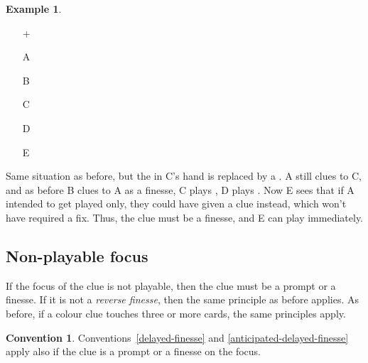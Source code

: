 \documentclass[a4paper]{article}
\theoremstyle{plain}
\theoremstyle{definition}
\newtheorem{example}[theorem]{Example}
\newtheorem{convention}[theorem]{Convention}
\begin{document}
\begin{example}	\hfill \\
	\begin{minipage}{0.45\textwidth}
		\begin{itemize}
			\item[\Large +]      
			\item[\Large A]    
			\item[\Large B]    
			\item[\Large C]    
			\item[\Large D]    
			\item[\Large E]    
		\end{itemize}
	\end{minipage}%
	\begin{minipage}{0.55\textwidth}
		Same situation as before, but the  in C's hand is replaced by a . A still clues  to C, and as before B clues  to A as a finesse, C plays , D plays . Now E sees that if A intended to get  played only, they could have given a  clue instead, which won't have required a fix. Thus, the  clue must be a finesse, and E can play  immediately.
	\end{minipage}
\end{example} \vspace{0.15 cm}

\subsection{Non-playable focus}

If the focus of the clue is not playable, then the clue must be a prompt or a finesse. If it is not a \emph{reverse finesse}, then the same principle as before applies. As before, if a colour clue touches three or more cards, the same principles apply.

\begin{convention}
	Conventions~\ref{delayed-finesse} and \ref{anticipated-delayed-finesse} apply also if the clue is a prompt or a finesse on the focus.
\end{convention}
\end{document}
